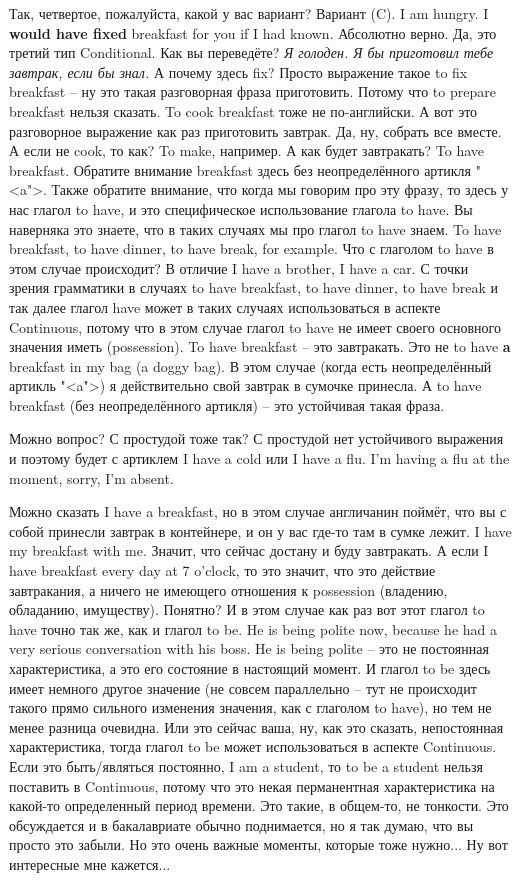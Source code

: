 \documentclass[main.tex]{subfiles}
\begin{document}
Так, четвертое, пожалуйста, какой у вас вариант?
Вариант (C).
I am hungry.
I \textbf{would have fixed} breakfast for you if I had known.
Абсолютно верно.
Да, это третий тип Conditional.
Как вы переведёте?
\textit{Я голоден. Я бы приготовил тебе завтрак, если бы знал.}
А почему здесь fix?
Просто выражение такое to fix breakfast -- ну это такая разговорная фраза приготовить.
Потому что to prepare breakfast нельзя сказать.
To cook breakfast тоже не по-английски.
А вот это разговорное выражение как раз приготовить завтрак.
Да, ну, собрать все вместе.
А если не cook, то как?
To make, например.
А как будет завтракать?
To have breakfast.
Обратите внимание breakfast здесь без неопределённого артикля "<a">.
Также обратите внимание, что когда мы говорим про эту фразу, то здесь у нас глагол to have, и это специфическое использование глагола to have.
Вы наверняка это знаете, что в таких случаях мы про глагол to have знаем.
To have breakfast, to have dinner, to have break, for example.
Что с глаголом to have в этом случае происходит?
В отличие I have a brother, I have a car.
С точки зрения грамматики в случаях to have breakfast, to have dinner, to have break и так далее глагол have может в таких случаях использоваться в аспекте Continuous, потому что в этом случае глагол to have не имеет своего основного значения иметь (possession).
To have breakfast -- это завтракать.
Это не to have \textbf{a} breakfast in my bag (a doggy bag).
В этом случае (когда есть неопределённый артикль "<a">) я действительно свой завтрак в сумочке принесла.
А to have breakfast (без неопределённого артикля) -- это устойчивая такая фраза.

Можно вопрос?
С простудой тоже так?
С простудой нет устойчивого выражения и поэтому будет с артиклем I have a cold или I have a flu.
I'm having a flu at the moment, sorry, I'm absent.

Можно сказать I have a breakfast, но в этом случае англичанин поймёт, что вы с собой принесли завтрак в контейнере, и он у вас где-то там в сумке лежит.
I have my breakfast with me.
Значит, что сейчас достану и буду завтракать.
А если I have breakfast every day at 7 o'clock, то это значит, что это действие завтракания, а ничего не имеющего отношения к possession (владению, обладанию, имуществу).
Понятно?
И в этом случае как раз вот этот глагол to have точно так же, как и глагол to be.
He is being polite now, because he had a very serious conversation with his boss.
He is being polite -- это не постоянная характеристика, а это его состояние в настоящий момент.
И глагол to be здесь имеет немного другое значение (не совсем параллельно -- тут не происходит такого прямо сильного изменения значения, как с глаголом to have), но тем не менее разница очевидна.
Или это сейчас ваша, ну, как это сказать, непостоянная характеристика, тогда глагол to be может использоваться в аспекте Continuous.
Если это быть/являться постоянно, I am a student, то to be a student нельзя поставить в Continuous, потому что это некая перманентная характеристика на какой-то определенный период времени.
Это такие, в общем-то, не тонкости.
Это обсуждается и в бакалавриате обычно поднимается, но я так думаю, что вы просто это забыли.
Но это очень важные моменты, которые тоже нужно...
Ну вот интересные мне кажется...
\end{document}
